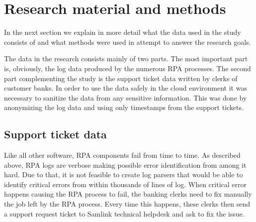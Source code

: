 

\section{Research material and methods}\label{sec:research-material-and-methods}

In the next section
we explain in more detail
what the data used in the study
consists of
and what methods were used
in attempt to answer the research goals.

The data in the research consists mainly of two parts.
The most important part is, obviously,
the log data produced by the numerous RPA processes.
The second part complementing the study
is the support ticket data written by clerks of customer banks.
In order to use the data safely in the cloud environment
it was necessary to sanitize the data
from any sensitive information.
This was done by anonymizing the log data
and using only timestamps from the support tickets.


\subsection{Support ticket data}\label{subsec:meth-efecte-ticket-data}

Like all other software,
RPA components fail from time to time.
As described above, %
RPA logs are verbose
making possible error identification from among it hard.
Due to that,
it is not feasible to create log parsers
that would be able to identify critical errors
from within thousands of lines of log.
When critical error happens
causing the RPA process to fail,
the banking clerks need to fix manually
the job left by the RPA process.
Every time this happens,
these clerks then send a support request ticket
to Samlink technical helpdesk
and ask to fix the issue.


